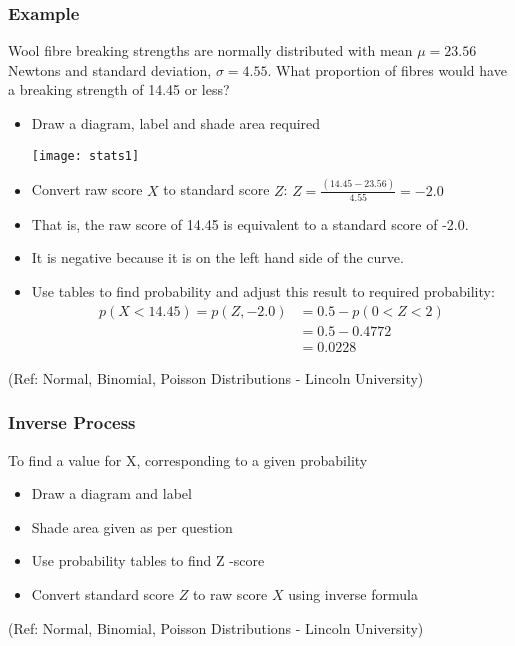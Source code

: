 \begin{frame}
\frametitle{Example}
Wool fibre breaking strengths are normally distributed with mean $\mu = 23.56$ Newtons
and standard deviation, $\sigma = 4.55$.
What proportion of fibres would have a breaking strength of 14.45 or less? 
\begin{itemize}
\item Draw a diagram, label and shade area required

\begin{center}
\texttt{[image: stats1]}
\end{center}

\item Convert raw score $X$ to standard score $Z$: $Z = \frac{(14.45 - 23.56)}{4.55} = - 2.0$
\item That is, the raw score of 14.45 is equivalent to a standard score of -2.0.
\item It is negative because it is on the left hand side of the curve.
\item Use tables to find probability and adjust this result to required probability: 
\begin{align*}
p(X < 14.45) = p(Z ,-2.0) &= 0.5 - p(0< Z < 2)\\
&= 0.5 - 0.4772\\
&=0.0228
\end{align*}
\end{itemize}


{\tiny (Ref: Normal, Binomial, Poisson Distributions -  Lincoln University)}
\end{frame}


\begin{frame}
\frametitle{Inverse Process}
To find a value for X, corresponding to a given probability
\begin{itemize}
\item Draw a diagram and label
\item Shade area given as per question
\item Use probability tables to find Z -score
\item Convert standard score $Z$ to raw score $X$ using inverse formula
\end{itemize}


{\tiny (Ref: Normal, Binomial, Poisson Distributions -  Lincoln University)}
\end{frame}

